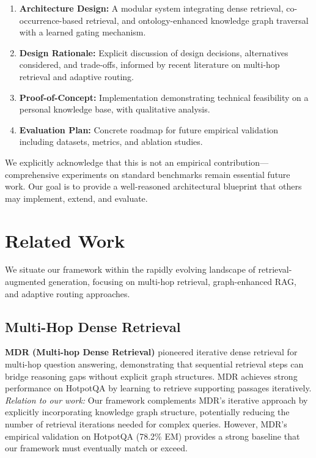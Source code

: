 \documentclass[11pt,a4paper]{article}
\begin{document}
\begin{enumerate}
    \item \textbf{Architecture Design:} A modular system integrating dense retrieval, co-occurrence-based retrieval, and ontology-enhanced knowledge graph traversal with a learned gating mechanism.
    
    \item \textbf{Design Rationale:} Explicit discussion of design decisions, alternatives considered, and trade-offs, informed by recent literature on multi-hop retrieval and adaptive routing.
    
    \item \textbf{Proof-of-Concept:} Implementation demonstrating technical feasibility on a personal knowledge base, with qualitative analysis.
    
    \item \textbf{Evaluation Plan:} Concrete roadmap for future empirical validation including datasets, metrics, and ablation studies.
\end{enumerate}

We explicitly acknowledge that this is not an empirical contribution---comprehensive experiments on standard benchmarks remain essential future work. Our goal is to provide a well-reasoned architectural blueprint that others may implement, extend, and evaluate.

\section{Related Work}
\label{sec:related_work}

We situate our framework within the rapidly evolving landscape of retrieval-augmented generation, focusing on multi-hop retrieval, graph-enhanced RAG, and adaptive routing approaches.

\subsection{Multi-Hop Dense Retrieval}

\textbf{MDR (Multi-hop Dense Retrieval)} \citep{xiong2021answering} pioneered iterative dense retrieval for multi-hop question answering, demonstrating that sequential retrieval steps can bridge reasoning gaps without explicit graph structures. MDR achieves strong performance on HotpotQA by learning to retrieve supporting passages iteratively. \textit{Relation to our work:} Our framework complements MDR's iterative approach by explicitly incorporating knowledge graph structure, potentially reducing the number of retrieval iterations needed for complex queries. However, MDR's empirical validation on HotpotQA (78.2\% EM) provides a strong baseline that our framework must eventually match or exceed.
\end{document}
